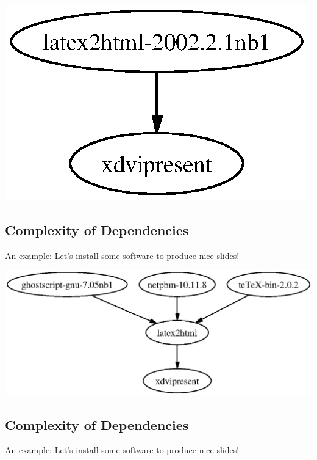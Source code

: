\documentclass[xga]{xdvislides}
\begin{document}
\vspace*{\fill}
\begin{center}
	\includegraphics[scale=1.0]{pics/xdvipresent.1.ps}
\end{center}

\subsection{Complexity of Dependencies}
An example: Let's install some software to produce nice slides! \\

\vspace*{\fill}
\begin{center}
	\includegraphics[scale=1.0]{pics/xdvipresent.2.ps}
\end{center}

\subsection{Complexity of Dependencies}
An example: Let's install some software to produce nice slides! \\
\end{document}
